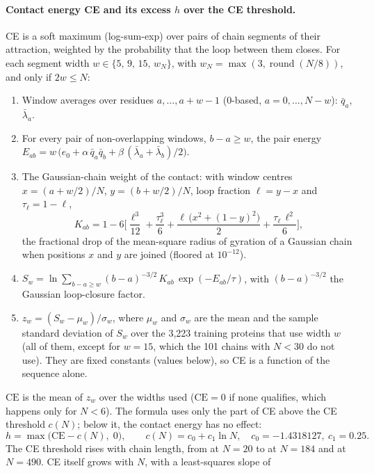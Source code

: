 \documentclass[11pt]{article}
\begin{document}
\paragraph{Contact energy CE and its excess $h$ over the CE threshold.} CE is a soft maximum (log-sum-exp) over pairs of chain segments of
their attraction, weighted by the probability that the loop between them closes. For each segment width $w\in\{5,\,9,\,15,\,w_N\}$, with
$w_N=\max(3,\operatorname{round}(N/8))$, and only if $2w\le N$:
\begin{enumerate}
\item Window averages over residues $a,\dots,a+w-1$ (0-based, $a=0,\dots,N-w$): $\bar q_a$, $\bar\lambda_a$.
\item For every pair of non-overlapping windows, $b-a\ge w$, the pair energy
  $E_{ab}=w\,\big(e_0+\alpha\,\bar q_a\bar q_b+\beta\,(\bar\lambda_a+\bar\lambda_b)/2\big)$.
\item The Gaussian-chain weight of the contact: with window centres $x=(a+w/2)/N$, $y=(b+w/2)/N$, loop fraction
  $\ell=y-x$ and $\tau_\ell=1-\ell$,
  \[
  K_{ab}=1-6\Big[\frac{\ell^3}{12}+\frac{\tau_\ell^3}{6}+\frac{\ell\,\big(x^2+(1-y)^2\big)}{2}+\frac{\tau_\ell\,\ell^2}{6}\Big],
  \]
  the fractional drop of the mean-square radius of gyration of a Gaussian chain when positions $x$ and $y$ are joined
  (floored at $10^{-12}$).
\item $S_w=\ln\sum_{b-a\ge w}(b-a)^{-3/2}\,K_{ab}\,\exp(-E_{ab}/\tau)$, with $(b-a)^{-3/2}$ the Gaussian
  loop-closure factor.
\item $z_w=(S_w-\mu_w)/\sigma_w$, where $\mu_w$ and $\sigma_w$ are the mean and the sample standard deviation of $S_w$
  over the 3{,}223 training proteins that use width $w$ (all of them, except for $w=15$, which the 101 chains with
  $N<30$ do not use). They are fixed constants (values below), so CE is a function of the sequence alone.
\end{enumerate}
$\mathrm{CE}$ is the mean of $z_w$ over the widths used ($\mathrm{CE}=0$ if none qualifies, which happens only for $N<6$).
The formula uses only the part of CE above the CE threshold $c(N)$; below it, the contact energy has no effect:
\begin{equation}
h=\max\big(\mathrm{CE}-c(N),\;0\big),\qquad c(N)=c_0+c_1\ln N,\quad c_0=-1.4318127,\ c_1=0.25 .
\end{equation}
The CE threshold rises with chain length, from  at $N=20$ to 
at $N=184$ and  at $N=490$. CE itself grows with $N$, with a least-squares slope of
\end{document}
